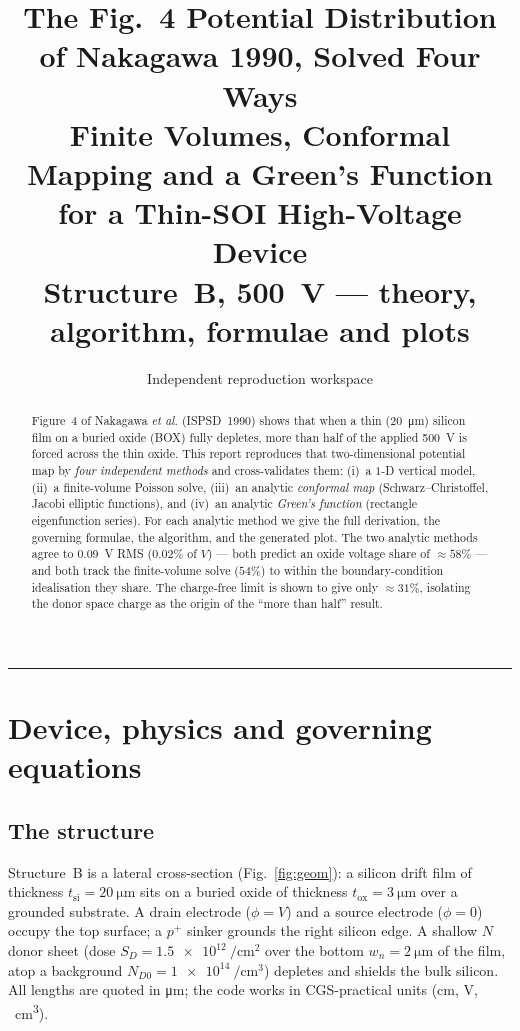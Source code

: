 \documentclass[11pt]{article}
\title{\vspace{-1.2cm}\textbf{The Fig.~4 Potential Distribution of Nakagawa 1990,
Solved Four Ways}\\[4pt]
\large Finite Volumes, Conformal Mapping and a Green's Function for a
Thin-SOI High-Voltage Device\\
\normalsize Structure~B, \SI{500}{\volt} --- theory, algorithm, formulae and plots}
\author{Independent reproduction workspace}
\date{}
\newcommand{\tox}{t_{\mathrm{ox}}}
\newcommand{\tsi}{t_{\mathrm{si}}}
\begin{document}
\maketitle
\vspace{-0.7cm}

\begin{abstract}
\noindent Figure~4 of Nakagawa \emph{et al.} (ISPSD~1990) shows that when a thin
(\SI{20}{\micro\meter}) silicon film on a buried oxide (BOX) fully depletes, more
than half of the applied \SI{500}{\volt} is forced across the thin oxide. This
report reproduces that two-dimensional potential map by \emph{four independent
methods} and cross-validates them: (i)~a $1$-D vertical model, (ii)~a
finite-volume Poisson solve, (iii)~an analytic \emph{conformal map}
(Schwarz--Christoffel, Jacobi elliptic functions), and (iv)~an analytic
\emph{Green's function} (rectangle eigenfunction series). For each analytic method
we give the full derivation, the governing formulae, the algorithm, and the
generated plot. The two analytic methods agree to \SI{0.09}{\volt} RMS
($0.02\%$ of $V$) --- both predict an oxide voltage share of $\approx 58\%$ ---
and both track the finite-volume solve ($54\%$) to within the boundary-condition
idealisation they share. The charge-free limit is shown to give only $\approx
31\%$, isolating the donor space charge as the origin of the ``more than half''
result.
\end{abstract}

\tableofcontents
\medskip
\hrule

\section{Device, physics and governing equations}

\subsection{The structure}
Structure~B is a lateral cross-section (Fig.~\ref{fig:geom}): a silicon drift film
of thickness $\tsi=\SI{20}{\micro\meter}$ sits on a buried oxide of thickness
$\tox=\SI{3}{\micro\meter}$ over a grounded substrate. A drain electrode ($\phi=V$)
and a source electrode ($\phi=0$) occupy the top surface; a $p^{+}$ sinker grounds
the right silicon edge. A shallow $N$ donor sheet (dose $S_{D}=\SI{1.5e12}{\per\cm\squared}$
over the bottom $w_{n}=\SI{2}{\micro\meter}$ of the film, atop a background
$N_{D0}=\SI{1e14}{\per\cm\cubed}$) depletes and shields the bulk silicon. All
lengths are quoted in \si{\micro\meter}; the code works in CGS-practical units
(cm, V, \si{\per\cm\cubed}).
\end{document}
